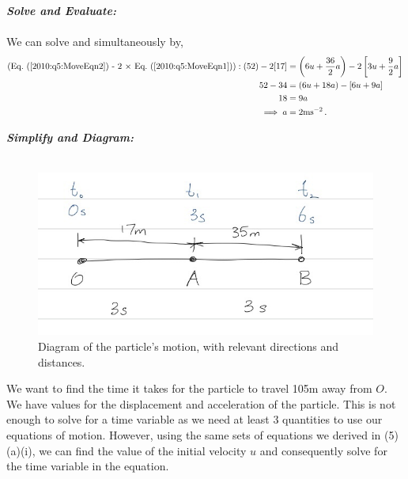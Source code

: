\begin{subquestions}
\begin{subsubquestions}
\textbf{\textit{Solve and Evaluate:}} \\ \\
We can solve  and  simultaneously by,
\begin{align}
	\text{(\req{2010:q5:MoveEqn2} - 2 $\times$ \req{2010:q5:MoveEqn1})}:(52) - 2[17] & = \left(6u + \frac{36}{2}a\right) - 2\left[3u + \frac{9}{2}a\right] \nn \\
	                                                              52 - 34 & = \left(6u + 18a\right) - \left[6u + 9a\right] \nn \\
	                                                                   18 & = 9a \nn \\
	                                                                   \implies a & = 2\text{ms}^{-2} \,.
\end{align}


\subsubquestion

\textbf{\textit{Simplify and Diagram:}} \\ \\
\begin{figure}[H]
	\begin{center}
		\includegraphics[scale=0.5]{../2010/figures/2010q5}
		\caption{\label{2010:q5:Move3} Diagram of the particle's motion, with relevant directions and distances.}
	\end{center}
\end{figure}
We want to find the time it takes for the particle to travel 105m away from $O$. We have values for the displacement and acceleration of the particle. This is not enough to solve for a time variable as we need at least 3 quantities to use our equations of motion. However, using the same sets of equations we derived in (5)(a)(i), we can find the value of the initial velocity $u$ and consequently solve for the time variable in the equation.





\end{subsubquestions}
\end{subquestions}
